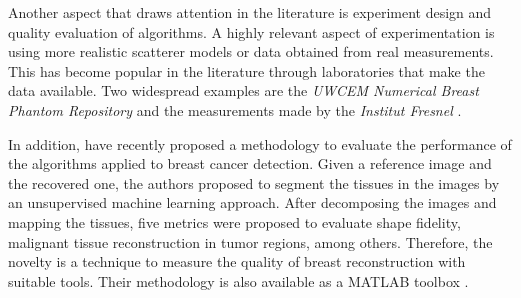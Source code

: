 		Another aspect that draws attention in the literature is experiment design and quality evaluation of algorithms. A highly relevant aspect of experimentation is using more realistic scatterer models or data obtained from real measurements. This has become popular in the literature through laboratories that make the data available. Two widespread examples are the \textit{UWCEM Numerical Breast Phantom Repository} \citep{burfeindt2012mri}  and the measurements made by the \textit{Institut Fresnel} \citep{geffrin2005free}.
		
		In addition, \cite{kurrant2021evaluating} have recently proposed a methodology to evaluate the performance of the algorithms applied to breast cancer detection. Given a reference image and the recovered one, the authors proposed to segment the tissues in the images by an unsupervised machine learning approach. After decomposing the images and mapping the tissues, five metrics were proposed to evaluate shape fidelity, malignant tissue reconstruction in tumor regions, among others. Therefore, the novelty is a technique to measure the quality of breast reconstruction with suitable tools. Their methodology is also available as a MATLAB toolbox \citep{kurrant2021mwsegeval}.
		
